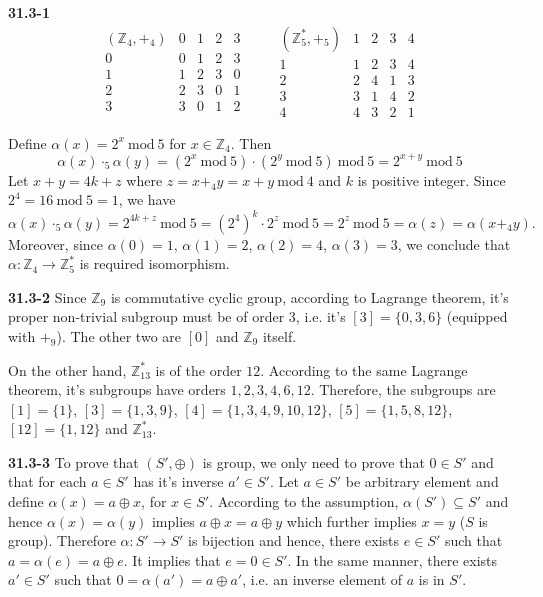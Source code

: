 \documentclass[12pt]{amsart}
\numberwithin{equation}{section}
\newcommand{\Z}{\mathbb{Z}}
\renewcommand{\mod}{\mathrm{\ mod\ }}
\renewcommand{\(}{\left(}
\renewcommand{\)}{\right)}
\renewcommand{\[}{\left[}
\renewcommand{\]}{\right]}
\begin{document}
\noindent \textbf{31.3-1}
$$
\begin{array}{c|cccc}
  (\Z_4,+_4) & 0 & 1 & 2 & 3 \\
  \hline
  0 & 0 & 1 & 2 & 3 \\
  1 & 1 & 2 & 3 & 0 \\
  2 & 2 & 3 & 0 & 1 \\
  3 & 3 & 0 & 1 & 2
\end{array} \qquad
\begin{array}{c|cccc}
  (\Z^*_5,+_5)
    & 1 & 2 & 3 & 4 \\
  \hline
  1 & 1 & 2 & 3 & 4 \\
  2 & 2 & 4 & 1 & 3 \\
  3 & 3 & 1 & 4 & 2 \\
  4 & 4 & 3 & 2 & 1
\end{array}
$$

Define $\alpha(x)=2^x \mod 5$ for $x \in \Z_4$. Then
$$
\alpha(x)\cdot_5\alpha(y) = (2^x \mod 5)\cdot (2^y \mod 5) \mod 5 = 2^{x+y} \mod 5
$$
Let $x+y=4k+z$ where $z = x+_4y = x+y \mod 4$ and $k$ is positive integer. Since $2^4=16 \mod 5=1$, we have
$$
\alpha(x)\cdot_5\alpha(y) = 2^{4k+z} \mod 5 = (2^4)^k \cdot 2^z \mod 5 = 2^z \mod 5 = \alpha(z) = \alpha(x+_4y).
$$
Moreover, since $\alpha(0)=1$, $\alpha(1)=2$, $\alpha(2)=4$, $\alpha(3)=3$, we conclude that $\alpha : \Z_4 \to \Z^*_5$ is required isomorphism.


\bigskip

\noindent \textbf{31.3-2} Since $\Z_9$ is commutative cyclic group, according to Lagrange theorem, it's proper non-trivial subgroup must be of order $3$, i.e. it's $[3]=\{0,3,6\}$ (equipped with $+_9$). The other two are $[0]$ and $\Z_9$ itself.

\smallskip

On the other hand, $\Z^*_{13}$ is of the order $12$. According to the same Lagrange theorem, it's subgroups have orders $1,2,3,4,6,12$. Therefore, the subgroups are $[1] = \{1\}$, $[3] = \{1, 3, 9\}$, $[4] = \{1, 3, 4, 9, 10, 12\}$, $[5] = \{1, 5, 8, 12\}$, $[12] =\{1, 12\}$ and $\Z^*_{13}$.

\bigskip

\noindent \textbf{31.3-3} To prove that $(S',\oplus)$ is group, we only need to prove that $0\in S'$ and that for each $a\in S'$ has it's inverse $a' \in S'$. Let $a\in S'$ be arbitrary element and define $\alpha(x) = a\oplus x$, for $x\in S'$. According to the assumption, $\alpha(S') \subseteq S'$ and hence $\alpha(x) = \alpha(y)$ implies $a\oplus x = a \oplus y$ which further implies $x=y$ ($S$ is group). Therefore $\alpha : S' \to S'$ is bijection and hence, there exists $e\in S'$ such that $a=\alpha(e)=a\oplus e$. It implies that $e=0\in S'$. In the same manner, there exists $a' \in S'$ such that $0=\alpha(a') = a\oplus a'$, i.e. an inverse element of $a$ is in $S'$.
\end{document}
